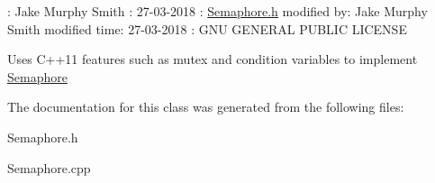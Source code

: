 \+: Jake Murphy Smith \+: 27-\/03-\/2018 \+: \hyperlink{_semaphore_8h_source}{Semaphore.\+h}  modified by\+: Jake Murphy Smith  modified time\+: 27-\/03-\/2018 \+: G\+NU G\+E\+N\+E\+R\+AL P\+U\+B\+L\+IC L\+I\+C\+E\+N\+SE

Uses C++11 features such as mutex and condition variables to implement \hyperlink{class_semaphore}{Semaphore} 

The documentation for this class was generated from the following files\+:\begin{DoxyCompactItemize}
\item 
Semaphore.\+h\item 
Semaphore.\+cpp\end{DoxyCompactItemize}
